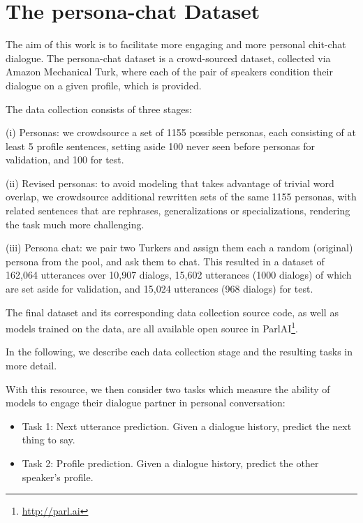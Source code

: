 \documentclass[11pt,a4paper]{article}
\begin{document}
\section{The {\sc persona-chat} Dataset} 

The aim of this work is to facilitate more engaging and more personal chit-chat dialogue. The {\sc persona-chat} dataset is a crowd-sourced dataset, collected via Amazon Mechanical Turk, where each of the pair of speakers condition their dialogue on a given profile, which is provided. 


The data collection consists of three stages:



(i) Personas: we crowdsource a set of 1155 possible personas, each consisting of at least 5 profile sentences, setting aside 100 never seen before personas for validation, and 100 for test.

(ii) Revised personas: to avoid modeling that takes advantage of trivial word overlap, we crowdsource  additional rewritten sets of the same 1155 personas, with related sentences that are rephrases, generalizations or specializations, rendering the task much more challenging.

(iii) Persona chat: we pair two Turkers and assign them each a random (original) persona from the pool, and ask them to chat. This resulted in a dataset of 162,064 utterances over 10,907 dialogs, 15,602 utterances (1000 dialogs) of which are set aside for validation, and 15,024 utterances
(968 dialogs) for test.



The final dataset and its corresponding data collection source  code, as well as models trained on the data, are all available open source in ParlAI\footnote{ {\small{\url{http://parl.ai}}}}.



In the following, we describe each data collection stage and the resulting tasks in more detail.




With this resource, we then consider two tasks which measure the ability of models to engage their dialogue partner in personal conversation:
\begin{itemize}
\item Task 1: Next utterance prediction. Given a dialogue history, predict the next thing to say.  \item Task 2: Profile prediction. Given a dialogue history, predict the other speaker's profile.
\end{itemize}
\end{document}
